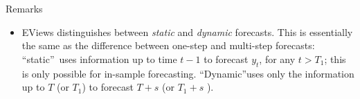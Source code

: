 \begin{frame}{Remarks}
\begin{itemize}


\item EViews distinguishes between \emph{\color{red}static} and
\emph{\color{red}dynamic} forecasts. This is essentially the same as the
difference between one-step and multi-step forecasts:
\textquotedblleft static\textquotedblright\ uses
information up to time $t-1$ to forecast $y_{t}$, for any $t>T_{1}$; this
is only possible for in-sample forecasting. \textquotedblleft Dynamic\textquotedblright uses
only the information up to $T$ (or $T_{1}$) to forecast $T+s$ (or $T_{1}+s$%
).

\end{itemize}
\end{frame}


